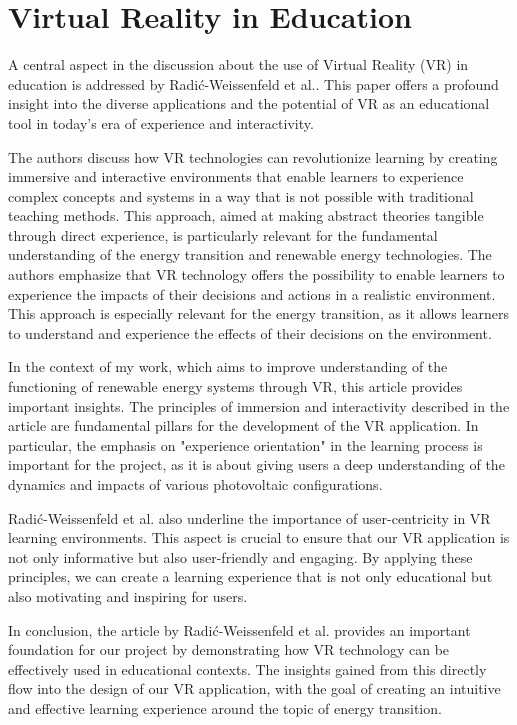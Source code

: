 \documentclass[draft, final]{vutinfth} %
\begin{document}
\section{Virtual Reality in Education}

A central aspect in the discussion about the use of Virtual Reality (VR) in education is addressed by Radić-Weissenfeld et al.\cite{hu2017virtual}. This paper offers a profound insight into the diverse applications and the potential of VR as an educational tool in today's era of experience and interactivity.

The authors discuss how VR technologies can revolutionize learning by creating immersive and interactive environments that enable learners to experience complex concepts and systems in a way that is not possible with traditional teaching methods. This approach, aimed at making abstract theories tangible through direct experience, is particularly relevant for the fundamental understanding of the energy transition and renewable energy technologies. The authors emphasize that VR technology offers the possibility to enable learners to experience the impacts of their decisions and actions in a realistic environment. This approach is especially relevant for the energy transition, as it allows learners to understand and experience the effects of their decisions on the environment.

In the context of my work, which aims to improve understanding of the functioning of renewable energy systems through VR, this article provides important insights. The principles of immersion and interactivity described in the article are fundamental pillars for the development of the VR application. In particular, the emphasis on "experience orientation" in the learning process is important for the project, as it is about giving users a deep understanding of the dynamics and impacts of various photovoltaic configurations.

Radić-Weissenfeld et al. also underline the importance of user-centricity in VR learning environments. This aspect is crucial to ensure that our VR application is not only informative but also user-friendly and engaging. By applying these principles, we can create a learning experience that is not only educational but also motivating and inspiring for users.

In conclusion, the article by Radić-Weissenfeld et al. provides an important foundation for our project by demonstrating how VR technology can be effectively used in educational contexts. The insights gained from this directly flow into the design of our VR application, with the goal of creating an intuitive and effective learning experience around the topic of energy transition.
\end{document}
